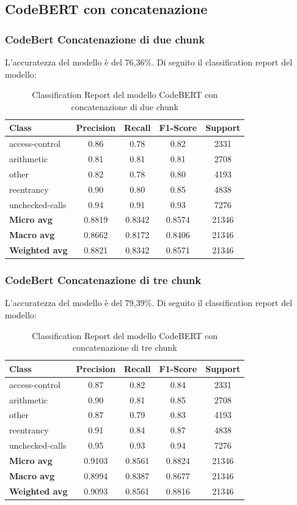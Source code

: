 \documentclass[../../Thesis.tex]{subfiles}
\begin{document}
\subsection{CodeBERT con concatenazione}
\subsubsection{CodeBert Concatenazione di due chunk}
L'accuratezza del modello \`e del 76,36\%. Di seguito il classification report del modello:

\begin{table}[H]
\centering
\small
\begin{tabular}{lcccc}
\hline
\textbf{Class} & \textbf{Precision} & \textbf{Recall} & \textbf{F1-Score} & \textbf{Support} \\
\hline
access-control & 0.86 & 0.78 & 0.82 & 2331 \\
arithmetic & 0.81 & 0.81 & 0.81 & 2708 \\
other & 0.82 & 0.78 & 0.80 & 4193 \\
reentrancy & 0.90 & 0.80 & 0.85 & 4838 \\
unchecked-calls & 0.94 & 0.91 & 0.93 & 7276 \\
\hline
\textbf{Micro avg} & 0.8819 & 0.8342 & 0.8574 & 21346 \\
\textbf{Macro avg} & 0.8662 & 0.8172 & 0.8406 & 21346 \\
\textbf{Weighted avg} & 0.8821 & 0.8342 & 0.8571 & 21346 \\
\hline
\end{tabular}
\caption{Classification Report del modello CodeBERT con concatenazione di due chunk}
\end{table}
\subsubsection{CodeBert Concatenazione di tre chunk}
L'accuratezza del modello \`e del 79,39\%. Di seguito il classification report del modello:

\begin{table}[H]
\centering
\small
\begin{tabular}{lcccc}
\hline
\textbf{Class} & \textbf{Precision} & \textbf{Recall} & \textbf{F1-Score} & \textbf{Support} \\
\hline
access-control & 0.87 & 0.82 & 0.84 & 2331 \\
arithmetic & 0.90 & 0.81 & 0.85 & 2708 \\
other & 0.87 & 0.79 & 0.83 & 4193 \\
reentrancy & 0.91 & 0.84 & 0.87 & 4838 \\
unchecked-calls & 0.95 & 0.93 & 0.94 & 7276 \\
\hline
\textbf{Micro avg} & 0.9103 & 0.8561 & 0.8824 & 21346 \\
\textbf{Macro avg} & 0.8994 & 0.8387 & 0.8677 & 21346 \\
\textbf{Weighted avg} & 0.9093 & 0.8561 & 0.8816 & 21346 \\
\hline
\end{tabular}
\caption{Classification Report del modello CodeBERT con concatenazione di tre chunk}
\end{table}
\end{document}
